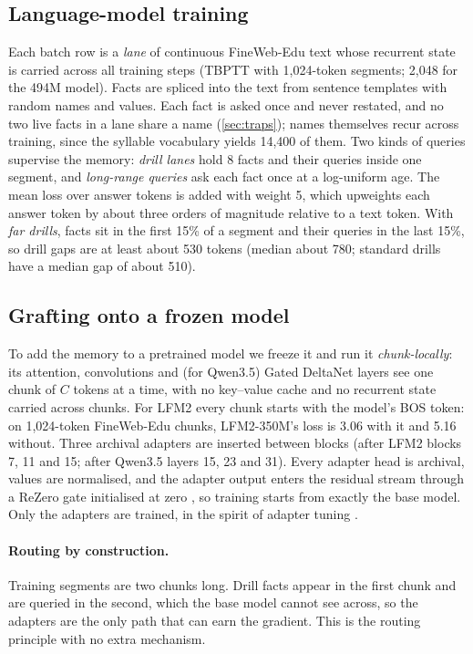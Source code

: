 \documentclass[11pt]{article}
\begin{document}
\subsection{Language-model training}
\label{sec:lm_training}
Each batch row is a \emph{lane} of continuous FineWeb-Edu text \citep{fineweb2024} whose recurrent state is carried across all training steps (TBPTT with 1{,}024-token segments; 2{,}048 for the 494M model). Facts are spliced into the text from sentence templates with random names and values. Each fact is asked once and never restated, and no two live facts in a lane share a name (\cref{sec:traps}); names themselves recur across training, since the syllable vocabulary yields 14{,}400 of them. Two kinds of queries supervise the memory: \emph{drill lanes} hold 8 facts and their queries inside one segment, and \emph{long-range queries} ask each fact once at a log-uniform age. The mean loss over answer tokens is added with weight 5, which upweights each answer token by about three orders of magnitude relative to a text token. With \emph{far drills}, facts sit in the first 15\% of a segment and their queries in the last 15\%, so drill gaps are at least about 530 tokens (median about 780; standard drills have a median gap of about 510).

\subsection{Grafting onto a frozen model}
\label{sec:graft_method}
To add the memory to a pretrained model we freeze it and run it \emph{chunk-locally}: its attention, convolutions and (for Qwen3.5) Gated DeltaNet layers see one chunk of $C$ tokens at a time, with no key--value cache and no recurrent state carried across chunks. For LFM2 every chunk starts with the model's BOS token: on 1{,}024-token FineWeb-Edu chunks, LFM2-350M's loss is 3.06 with it and 5.16 without. Three archival adapters are inserted between blocks (after LFM2 blocks 7, 11 and 15; after Qwen3.5 layers 15, 23 and 31). Every adapter head is archival, values are normalised, and the adapter output enters the residual stream through a ReZero gate initialised at zero \citep{rezero2020}, so training starts from exactly the base model. Only the adapters are trained, in the spirit of adapter tuning \citep{adapters2019}.

\paragraph{Routing by construction.} Training segments are two chunks long. Drill facts appear in the first chunk and are queried in the second, which the base model cannot see across, so the adapters are the only path that can earn the gradient. This is the routing principle with no extra mechanism.
\end{document}
